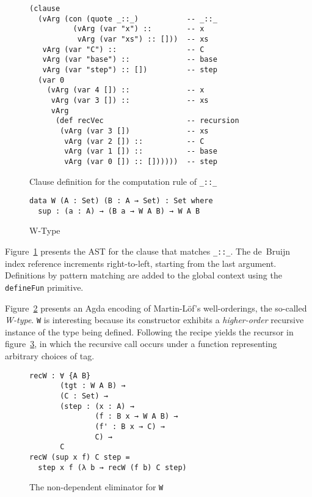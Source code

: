\documentclass[sigplan,10pt]{acmart}
\begin{document}
\begin{figure}
\begin{center}
\begingroup
\fontsize{9pt}{10pt}\selectfont
\begin{Verbatim}
(clause
  (vArg (con (quote _::_)           -- _::_
          (vArg (var "x") ::        -- x
           vArg (var "xs") :: []))  -- xs
   vArg (var "C") ::                -- C
   vArg (var "base") ::             -- base
   vArg (var "step") :: [])         -- step
  (var 0                            
    (vArg (var 4 []) ::             -- x
     vArg (var 3 []) ::             -- xs
     vArg
      (def recVec                   -- recursion
       (vArg (var 3 [])             -- xs
        vArg (var 2 []) ::          -- C
        vArg (var 1 []) ::          -- base
        vArg (var 0 []) :: [])))))  -- step

\end{Verbatim}
\endgroup
\end{center}
\caption{Clause definition for the computation rule of \texttt{\_::\_}}
\label{fig:ast-cdef}
\end{figure}
\normalsize

\begin{figure}
\begin{center}
\begin{BVerbatim}
data W (A : Set) (B : A → Set) : Set where
  sup : (a : A) → (B a → W A B) → W A B
\end{BVerbatim}
\end{center}
\caption{W-Type}
\label{fig:W-type}
\end{figure}

Figure~\ref{fig:ast-cdef} presents the AST for the clause that matches \texttt{\_::\_}.
The de~Bruijn index reference increments right-to-left, starting from the last argument.
Definitions by pattern matching are added to the global context using the \texttt{defineFun} primitive.


Figure~\ref{fig:W-type} presents an Agda encoding of Martin-Löf's well-orderings, the so-called \emph{W-type}.
\texttt{W} is interesting because its constructor exhibits a \emph{higher-order} recursive instance of the type being defined.
Following the recipe yields the recursor in figure~\ref{fig:recW}, in which the recursive call occurs under a function representing arbitrary choices of tag.
\begin{figure}
\begin{Verbatim}
recW : ∀ {A B}
       (tgt : W A B) →
       (C : Set) →
       (step : (x : A) →
               (f : B x → W A B) →
               (f' : B x → C) →
               C) →
       C
recW (sup x f) C step =
  step x f (λ b → recW (f b) C step)
\end{Verbatim}
  \caption{The non-dependent eliminator for \texttt{W}}
  \label{fig:recW}
\end{figure}
\end{document}
